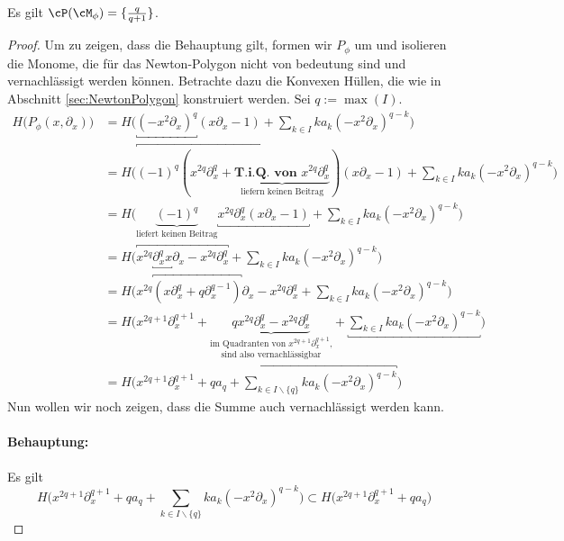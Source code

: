 \begin{lem}
Es gilt $\cP(\cM_{\phi})=\{\frac{q}{q+1}\}$.
\end{lem}
\begin{comment}
Allgemeiner? für allgemeine $\phi$??
\end{comment}
\begin{proof} \cite[5.b.]{sabbah_Fourier-local}
Um zu zeigen, dass die Behauptung gilt, formen wir $P_{\phi}$ um und isolieren
die Monome, die für das Newton-Polygon nicht von bedeutung sind und
vernachlässigt werden können. Betrachte dazu die Konvexen Hüllen, die wie in
Abschnitt \ref{sec:NewtonPolygon} konstruiert werden. Sei $q:=\max(I)$.
\begin{align*}
H\Big(P_{\phi}(x,\partial_x)\Big) &= H\Big(\underbracket{(-x^2\partial_x)^{q}}
  (x\partial_x-1) + \sum_{k\in I}k a_k(-x^2\partial_x)^{q-k}\Big)
\\&= H\Big(\overbracket{(-1)^q(x^{2q}\partial_x^q
  + \underset{\text{liefern keinen Beitrag}}{
  \underbrace{\textbf{T.i.Q. von }x^{2q}\partial_x^q}})}
  (x\partial_x - 1) + \sum_{k\in I}k a_k(-x^2\partial_x)^{q-k} \Big)
\\&= H\Big(\underset{\text{liefert keinen Beitrag}}{\underbrace{(-1)^q}}
  \underbracket{x^{2q}\partial_x^q (x\partial_x - 1)} 
  + \sum_{k\in I}k a_k(-x^2\partial_x)^{q-k} \Big)
\\&= H\Big(\overbracket{x^{2q}\underbracket{\partial_x^q x}\partial_x
  - x^{2q}\partial_x^q} + \sum_{k\in I}k a_k(-x^2\partial_x)^{q-k} \Big)
\\&= H\Big(x^{2q}\overbracket{(x\partial_x^q + q\partial_x^{q-1})}\partial_x
  - x^{2q}\partial_x^q + \sum_{k\in I}k a_k(-x^2\partial_x)^{q-k} \Big)
\\&= H\Big(x^{2q + 1}\partial_x^{q + 1}
  + \underset{\text{sind also vernachlässigbar}}{
  \underset{\text{im Quadranten von $x^{2q + 1}\partial_x^{q + 1}$,}}{
  \underbrace{qx^{2q}\partial_x^{q} - x^{2q}\partial_x^q}}}
  +\underbracket{ \sum_{k\in I}k a_k(-x^2\partial_x)^{q-k}} \Big)
\\&= H\Big(x^{2q + 1}\partial_x^{q + 1} +\overbracket{ qa_q 
  + \sum_{k\in I\backslash\{q\}}k a_k(-x^2\partial_x)^{q-k}} \Big)
\end{align*}
Nun wollen wir noch zeigen, dass die Summe auch vernachlässigt werden kann.
\paragraph{Behauptung:} Es gilt
\[
H\Big(x^{2q + 1}\partial_x^{q + 1} + qa_q 
  + \sum_{k\in I\backslash\{q\}}k a_k(-x^2\partial_x)^{q-k} \Big)
\subset H\Big(x^{2q + 1}\partial_x^{q + 1} + qa_q \Big)
\]

\end{proof}
